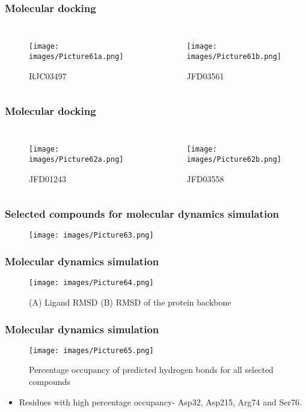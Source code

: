 \documentclass{beamer}
\begin{document}
\begin{frame}
\frametitle{\textbf{Molecular docking}}
\begin{columns}[c] 
\begin{figure}
\texttt{[image: images/Picture61a.png]}
\caption{RJC03497}
\end{figure}
\begin{figure}
\texttt{[image: images/Picture61b.png]}
\caption{JFD03561}
\end{figure}
\end{columns}
\end{frame}

\begin{frame}
\frametitle{\textbf{Molecular docking}}
\begin{columns}[c] 
\begin{figure}
\texttt{[image: images/Picture62a.png]}
\caption{JFD01243}
\end{figure}
\begin{figure}
\texttt{[image: images/Picture62b.png]}
\caption{JFD03558}
\end{figure}
\end{columns}
\end{frame}

\begin{frame}
\frametitle{\textbf{Selected compounds for molecular dynamics simulation}}
\begin{figure}
\texttt{[image: images/Picture63.png]}
\end{figure}
\end{frame}

\begin{frame}
\frametitle{\textbf{Molecular dynamics simulation}}
\begin{figure}
\texttt{[image: images/Picture64.png]}
\caption{(A) Ligand RMSD (B) RMSD of the protein backbone}
\end{figure}
\end{frame}

\begin{frame}
\frametitle{\textbf{Molecular dynamics simulation}}
\begin{figure}
\texttt{[image: images/Picture65.png]}
\caption{Percentage occupancy of predicted hydrogen bonds for all selected compounds}
\end{figure}
\begin{itemize}
\item Residues with high percentage occupancy- Asp32, Asp215, Arg74 and Ser76.
\end{itemize}
\end{frame}
\end{document}

